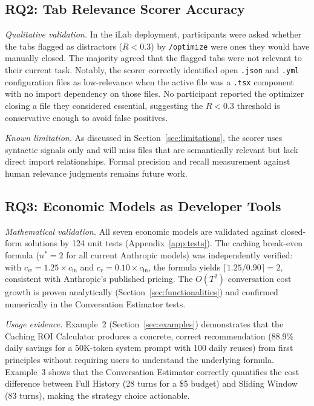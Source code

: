 \documentclass[a4paper,fleqn]{cas-dc}
\begin{document}
\subsection{RQ2: Tab Relevance Scorer Accuracy}

\textit{Qualitative validation.} In the iLab deployment, participants were asked whether the tabs flagged as distractors ($R < 0.3$) by \texttt{/optimize} were ones they would have manually closed. The majority agreed that the flagged tabs were not relevant to their current task. Notably, the scorer correctly identified open \texttt{.json} and \texttt{.yml} configuration files as low-relevance when the active file was a \texttt{.tsx} component with no import dependency on those files. No participant reported the optimizer closing a file they considered essential, suggesting the $R < 0.3$ threshold is conservative enough to avoid false positives.

\textit{Known limitation.} As discussed in Section~\ref{sec:limitations}, the scorer uses syntactic signals only and will miss files that are semantically relevant but lack direct import relationships. Formal precision and recall measurement against human relevance judgments remains future work.

\subsection{RQ3: Economic Models as Developer Tools}

\textit{Mathematical validation.} All seven economic models are validated against closed-form solutions by 124 unit tests (Appendix~\ref{app:tests}). The caching break-even formula ($n^* = 2$ for all current Anthropic models) was independently verified: with $c_w = 1.25 \times c_\mathrm{in}$ and $c_r = 0.10 \times c_\mathrm{in}$, the formula yields $\lceil 1.25/0.90 \rceil = 2$, consistent with Anthropic's published pricing. The $O(T^2)$ conversation cost growth is proven analytically (Section~\ref{sec:functionalities}) and confirmed numerically in the Conversation Estimator tests.

\textit{Usage evidence.} Example~2 (Section~\ref{sec:examples}) demonstrates that the Caching ROI Calculator produces a concrete, correct recommendation (88.9\% daily savings for a 50K-token system prompt with 100 daily reuses) from first principles without requiring users to understand the underlying formula. Example~3 shows that the Conversation Estimator correctly quantifies the cost difference between Full History (28 turns for a \$5 budget) and Sliding Window (83 turns), making the strategy choice actionable.
\end{document}

